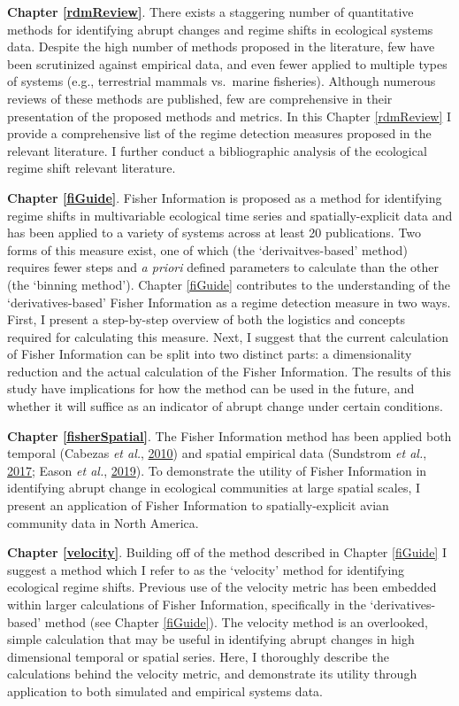 \documentclass[12pt,twoside,openany]{reedthesis}
\begin{document}
\textbf{Chapter \ref{rdmReview}}. There exists a staggering number of quantitative methods for identifying abrupt changes and regime shifts in ecological systems data. Despite the high number of methods proposed in the literature, few have been scrutinized against empirical data, and even fewer applied to multiple types of systems (e.g., terrestrial mammals vs.~marine fisheries). Although numerous reviews of these methods are published, few are comprehensive in their presentation of the proposed methods and metrics. In this Chapter \ref{rdmReview} I provide a comprehensive list of the regime detection measures proposed in the relevant literature. I further conduct a bibliographic analysis of the ecological regime shift relevant literature.

\textbf{Chapter \ref{fiGuide}}. Fisher Information is proposed as a method for identifying regime shifts in multivariable ecological time series and spatially-explicit data and has been applied to a variety of systems across at least 20 publications. Two forms of this measure exist, one of which (the `derivaitves-based' method) requires fewer steps and \emph{a priori} defined parameters to calculate than the other (the `binning method'). Chapter \ref{fiGuide} contributes to the understanding of the `derivatives-based' Fisher Information as a regime detection measure in two ways. First, I present a step-by-step overview of both the logistics and concepts required for calculating this measure. Next, I suggest that the current calculation of Fisher Information can be split into two distinct parts: a dimensionality reduction and the actual calculation of the Fisher Information. The results of this study have implications for how the method can be used in the future, and whether it will suffice as an indicator of abrupt change under certain conditions.

\textbf{Chapter \ref{fisherSpatial}}. The Fisher Information method has been applied both temporal (Cabezas \emph{et al.}, \protect\hyperlink{ref-cabezas_san_2010}{2010}) and spatial empirical data (Sundstrom \emph{et al.}, \protect\hyperlink{ref-sundstrom2017detecting}{2017}; Eason \emph{et al.}, \protect\hyperlink{ref-eason2019information}{2019}). To demonstrate the utility of Fisher Information in identifying abrupt change in ecological communities at large spatial scales, I present an application of Fisher Information to spatially-explicit avian community data in North America.

\textbf{Chapter \ref{velocity}}. Building off of the method described in Chapter \ref{fiGuide} I suggest a method which I refer to as the `velocity' method for identifying ecological regime shifts. Previous use of the velocity metric has been embedded within larger calculations of Fisher Information, specifically in the `derivatives-based' method (see Chapter \ref{fiGuide}). The velocity method is an overlooked, simple calculation that may be useful in identifying abrupt changes in high dimensional temporal or spatial series. Here, I thoroughly describe the calculations behind the velocity metric, and demonstrate its utility through application to both simulated and empirical systems data.
\end{document}

